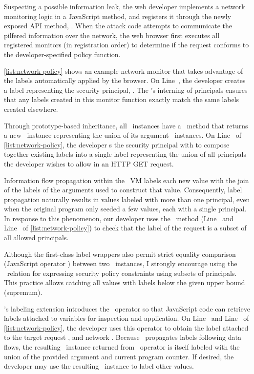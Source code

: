 Suspecting a possible information leak, the web developer implements a network monitoring logic in a JavaScript method, and registers it through the newly exposed API method, .
When the attack code attempts to communicate the pilfered information over the network, the web browser first executes all registered monitors (in registration order) to determine if the request conforms to the developer-specified policy function.

\autoref{list:network-policy} shows an example network monitor that takes advantage of the labels automatically applied by the browser.
On Line~, the developer creates a label representing the security principal, .
The \FlowLabelRegistry's interning of principals ensures that any labels created in this monitor function exactly match the same labels created elsewhere.

Through prototype-based inheritance, all \FlowLabelObject\ instances have a \mjoin\ method that returns a new \FlowLabelObject\ instance representing the union of its argument \FlowLabelObject\ instances.
On Line~ of \autoref{list:network-policy}, the developer \mjoin s the security principal  with  to compose together existing labels into a single label representing the union of all principals the developer wishes to allow in an HTTP GET request.

Information flow propagation within the \FlowCore\ VM labels each new value with the join of the labels of the arguments used to construct that value.
Consequently, label propagation naturally results in values labeled with more than one principal, even when the original program only seeded a few values, each with a single principal.
In response to this phenomenon, our developer uses the \msubsumes\ method (Line~ and Line~ of \autoref{list:network-policy}) to check that the label of the request is a subset of all allowed principals.

Although the first-class label wrappers also permit strict equality comparison (JavaScript operator \code{===}) between two \FlowLabelObject\ instances, I strongly encourage using the \msubsumes\ relation for expressing security policy constraints using subsets of principals.
This practice allows catching all values with labels below the given upper bound (supremum).

\FlowCore's labeling extension introduces the \mlabelof\ operator so that JavaScript code can retrieve labels attached to variables for inspection and application.
On Line~ and Line~ of \autoref{list:network-policy}, the developer uses this operator to obtain the label attached to the target request , and network .
Because \FlowCore\ propagates labels following data flows, the resulting \FlowLabelObject\ instance returned from \mlabelof\ operator is itself labeled with the union of the provided argument and current program counter.
If desired, the developer may use the resulting \FlowLabelObject\ instance to label other values.

